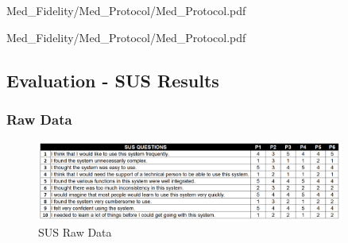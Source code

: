 \documentclass[a4 paper, 12pt]{article}
\begin{document}
    \pagebreak     
    
                    {Med_Fidelity/Med_Protocol/Med_Protocol.pdf}
                    \label{sec:B.4}
    
                    {Med_Fidelity/Med_Protocol/Med_Protocol.pdf}

    \pagebreak     
    
                \label{sec:B.5}
    

    \pagebreak     
    
                \label{sec:B.6}


    \pagebreak    
    \subsection{Evaluation - SUS Results}
    \label{sec:B.7} 

    \subsubsection*{Raw Data}
        \begin{figure} [H]
            \centering
            \includegraphics[width=0.9\textwidth, frame]
                {./Med_Fidelity/Med_SUS_Raw.PNG}  
            \caption{SUS Raw Data}
        \end{figure}
\end{document}
